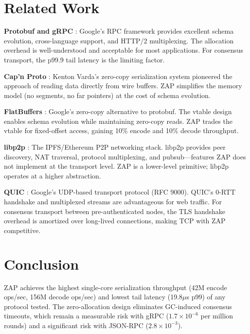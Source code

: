 \documentclass[11pt,letterpaper]{article}
\begin{document}
\section{Related Work}

\textbf{Protobuf and gRPC} \cite{grpc}: Google's RPC framework provides excellent schema evolution, cross-language support, and HTTP/2 multiplexing. The allocation overhead is well-understood \cite{protobuf} and acceptable for most applications. For consensus transport, the p99.9 tail latency is the limiting factor.

\textbf{Cap'n Proto} \cite{capnp}: Kenton Varda's zero-copy serialization system pioneered the approach of reading data directly from wire buffers. ZAP simplifies the memory model (no segments, no far pointers) at the cost of schema evolution.

\textbf{FlatBuffers} \cite{flatbuf}: Google's zero-copy alternative to protobuf. The vtable design enables schema evolution while maintaining zero-copy reads. ZAP trades the vtable for fixed-offset access, gaining 10\% encode and 10\% decode throughput.

\textbf{libp2p} \cite{libp2p}: The IPFS/Ethereum P2P networking stack. libp2p provides peer discovery, NAT traversal, protocol multiplexing, and pubsub---features ZAP does not implement at the transport level. ZAP is a lower-level primitive; libp2p operates at a higher abstraction.

\textbf{QUIC} \cite{quic}: Google's UDP-based transport protocol (RFC 9000). QUIC's 0-RTT handshake and multiplexed streams are advantageous for web traffic. For consensus transport between pre-authenticated nodes, the TLS handshake overhead is amortized over long-lived connections, making TCP with ZAP competitive.

\section{Conclusion}

ZAP achieves the highest single-core serialization throughput (42M encode ops/sec, 156M decode ops/sec) and lowest tail latency (19.8$\mu$s p99) of any protocol tested. The zero-allocation design eliminates GC-induced consensus timeouts, which remain a measurable risk with gRPC ($1.7 \times 10^{-6}$ per million rounds) and a significant risk with JSON-RPC ($2.8 \times 10^{-3}$).
\end{document}
